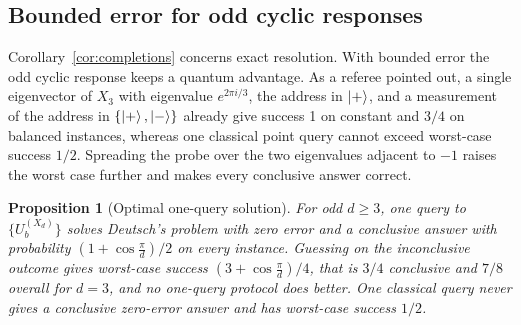 \documentclass[
  aps,
  pra,
  reprint,
  nofootinbib
]{revtex4-2}
\newtheorem{proposition}{Proposition}
\begin{document}
\subsection{Bounded error for odd cyclic responses}

Corollary~\ref{cor:completions} concerns exact resolution. With bounded error
the odd cyclic response keeps a quantum advantage. As a referee pointed out,
a single eigenvector of \(X_3\) with eigenvalue \(e^{2\pi i/3}\), the address in \(\ket+\), and a
measurement of the address in \(\{\ket+,\ket-\}\) already give success 1 on
constant and \(3/4\) on balanced instances, whereas one classical point query
cannot exceed worst-case success \(1/2\). Spreading the probe over the two
eigenvalues adjacent to \(-1\) raises the worst case further and makes every
conclusive answer correct.

\begin{proposition}[Optimal one-query solution]\label{prop:bounded}
For odd \(d\ge3\), one query to \(\{U_b^{(X_d)}\}\) solves Deutsch's problem
with zero error and a conclusive answer with probability
\((1+\cos\frac{\pi}{d})/2\) on every instance. Guessing on the inconclusive
outcome gives worst-case success \((3+\cos\frac{\pi}{d})/4\), that is \(3/4\)
conclusive and \(7/8\) overall for \(d=3\), and no one-query protocol does
better. One classical query never gives a conclusive zero-error answer and has
worst-case success \(1/2\).
\end{proposition}
\end{document}

